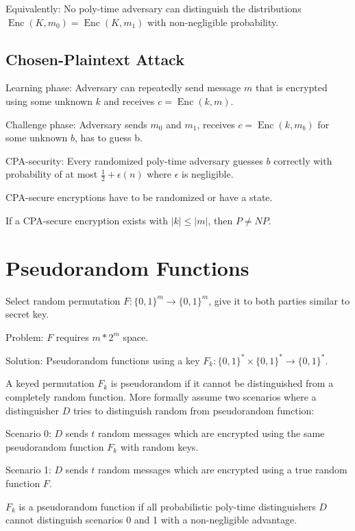 \documentclass[11pt]{article}
\DeclareMathOperator{\Enc}{Enc}
\begin{document}
    Equivalently: No poly-time adversary can distinguish the distributions
    $\Enc(K, m_0) = \Enc(K, m_1)$ with non-negligible probability.

    \subsection{Chosen-Plaintext Attack}

    Learning phase: Adversary can repeatedly send message $m$ that is encrypted using some
    unknown $k$ and receives $c = \Enc(k, m)$.

    Challenge phase: Adversary sends $m_0$ and $m_1$, receives $c = \Enc(k, m_b)$ for some 
    unknown $b$, has to guess b.

    CPA-security: Every randomized poly-time adversary guesses $b$ correctly with
    probability of at most $\frac{1}{2} + \epsilon(n)$ where $\epsilon$ is negligible.

    CPA-secure encryptions have to be randomized or have a state.

    If a CPA-secure encryption exists with $|k| \leq |m|$, then $P \neq NP$.

    \section{Pseudorandom Functions}

    Select random permutation $F: \{0, 1\}^m \to  \{0, 1\}^m$, give it to both parties
    similar to secret key.

    Problem: $F$ requires $m * 2^m$ space.

    Solution: Pseudorandom functions using a key $F_k: \{0, 1\}^* \times \{0, 1\}^* \to \{0, 1\}^*$.

    A keyed permutation $F_k$ is pseudorandom if it cannot be distinguished from a completely
    random function. More formally assume two scenarios where a distinguisher $D$ tries to distinguish
    random from pseudorandom function:

    Scenario 0: $D$ sends $t$ random messages which are encrypted using the same pseudorandom function $F_k$
    with random keys.

    Scenario 1: $D$ sends $t$ random messages which are encrypted using a true random function $F$.

    $F_k$ is a pseudorandom function if all probabilistic poly-time distinguishers $D$ cannot distinguish
    scenarios 0 and 1 with a non-negligible advantage.
\end{document}
